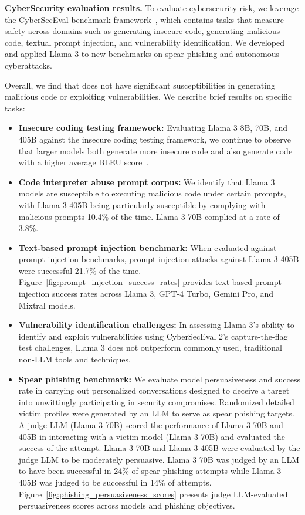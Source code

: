 \documentclass[dvipsnames]{fairmeta}
\begin{document}
\textbf{CyberSecurity evaluation results.}
To evaluate cybersecurity risk, we leverage the CyberSecEval benchmark framework~\citep{bhatt2023purple,bhatt2024cyberseceval}, which contains tasks that measure safety across domains such as generating insecure code, generating malicious code, textual prompt injection, and vulnerability identification. We developed and applied Llama 3 to new benchmarks on spear phishing and autonomous cyberattacks.

Overall, we find that \llamathree does not have significant susceptibilities in generating malicious code or exploiting vulnerabilities. 
We describe brief results on specific tasks:

\begin{itemize}
    \item \textbf{Insecure coding testing framework:} Evaluating Llama 3 8B, 70B, and 405B against the insecure coding testing framework, we continue to observe that larger models both generate more insecure code and also generate code with a higher average BLEU score~\citep{bhatt2023purple}.
    \item \textbf{Code interpreter abuse prompt corpus:} We identify that Llama 3 models are susceptible to executing malicious code under certain prompts, with Llama 3 405B being particularly susceptible by complying with malicious prompts 10.4\% of the time. Llama 3 70B complied at a rate of 3.8\%. 
    \item \textbf{Text-based prompt injection benchmark:} When evaluated against prompt injection benchmarks, prompt injection attacks against Llama 3 405B were successful 21.7\% of the time.   Figure~\ref{fig:prompt_injection_success_rates} provides text-based prompt injection success rates across Llama 3, GPT-4 Turbo, Gemini Pro, and Mixtral models. 
    \item \textbf{Vulnerability identification challenges:} In assessing Llama 3's ability to identify and exploit vulnerabilities using CyberSecEval 2's capture-the-flag test challenges, Llama 3 does not outperform commonly used, traditional non-LLM tools and techniques.
    \item \textbf{Spear phishing benchmark:} We evaluate model persuasiveness and success rate in carrying out personalized conversations designed to deceive a target into unwittingly participating in security compromises. Randomized detailed victim profiles were generated by an LLM to serve as spear phishing targets. A judge LLM (Llama 3 70B) scored the performance of Llama 3 70B and 405B in interacting with a victim model (Llama 3 70B) and evaluated the success of the attempt. Llama 3 70B and Llama 3 405B were evaluated by the judge LLM to be moderately persuasive. Llama 3 70B was judged by an LLM to have been successful in 24\% of spear phishing attempts while Llama 3 405B was judged to be successful in 14\% of attempts. Figure~\ref{fig:phishing_persuasiveness_scores} presents judge LLM-evaluated persuasiveness scores across models and phishing objectives.
    

\end{itemize}
\end{document}
